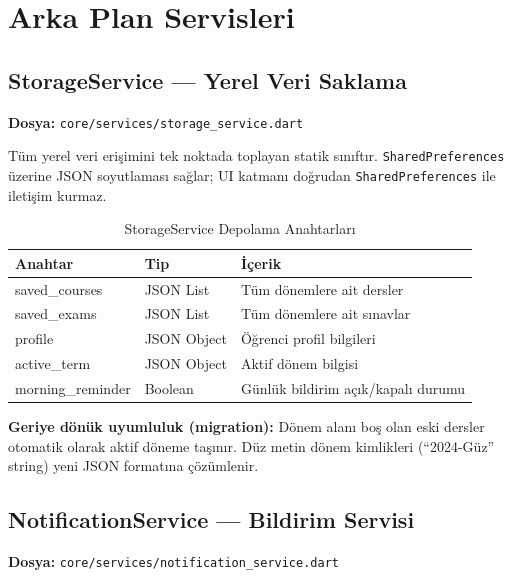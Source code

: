 \documentclass[12pt,a4paper]{article}
\begin{document}
\section{Arka Plan Servisleri}

\subsection{StorageService — Yerel Veri Saklama}
\textbf{Dosya:} \texttt{core/services/storage\_service.dart}

Tüm yerel veri erişimini tek noktada toplayan statik sınıftır. \texttt{SharedPreferences} üzerine JSON soyutlaması sağlar; UI katmanı doğrudan \texttt{SharedPreferences} ile iletişim kurmaz.

\begin{table}[H]
    \centering
    \caption{StorageService Depolama Anahtarları}
    \label{tab:storage}
    \renewcommand{\arraystretch}{1.3}
    \begin{tabularx}{\textwidth}{>{\ttfamily}l l X}
        \toprule
        \normalfont\textbf{Anahtar} & \textbf{Tip} & \textbf{İçerik} \\
        \midrule
        saved\_courses    & JSON List   & Tüm dönemlere ait dersler \\
        saved\_exams      & JSON List   & Tüm dönemlere ait sınavlar \\
        profile           & JSON Object & Öğrenci profil bilgileri \\
        active\_term      & JSON Object & Aktif dönem bilgisi \\
        morning\_reminder & Boolean     & Günlük bildirim açık/kapalı durumu \\
        \bottomrule
    \end{tabularx}
\end{table}

\textbf{Geriye dönük uyumluluk (migration):} Dönem alanı boş olan eski dersler otomatik olarak aktif döneme taşınır. Düz metin dönem kimlikleri (``2024-Güz'' string) yeni JSON formatına çözümlenir.

\subsection{NotificationService — Bildirim Servisi}
\textbf{Dosya:} \texttt{core/services/notification\_service.dart}
\end{document}

